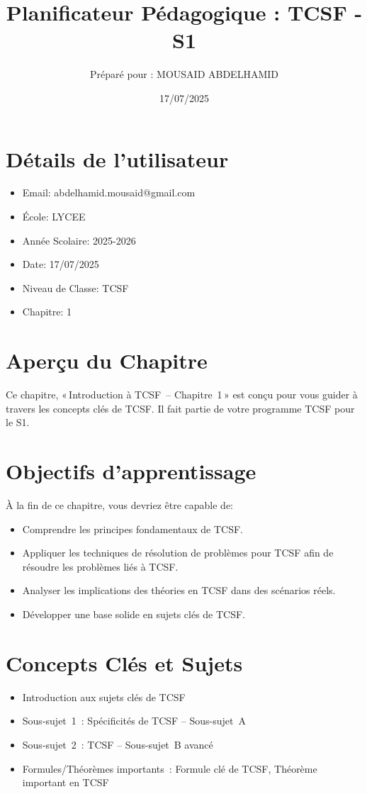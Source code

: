 \documentclass{article}
\title{Planificateur Pédagogique : TCSF - S1}
\author{Préparé pour : MOUSAID ABDELHAMID}
\date{17/07/2025}
\begin{document}
	
	\maketitle
	
	\section*{Détails de l'utilisateur}
	\begin{itemize}
		\item Email: abdelhamid.mousaid@gmail.com
		\item École: LYCEE
		\item Année Scolaire: 2025-2026
		\item Date: 17/07/2025
		\item Niveau de Classe: TCSF
		\item Chapitre: 1
	\end{itemize}
	
	\section*{Aperçu du Chapitre}
	Ce chapitre, « Introduction à TCSF – Chapitre 1 »  
	est conçu pour vous guider à travers les concepts clés de TCSF.  
	Il fait partie de votre programme TCSF pour le S1.
	
	\section*{Objectifs d'apprentissage}
	À la fin de ce chapitre, vous devriez être capable de:
	\begin{itemize}
		\item Comprendre les principes fondamentaux de TCSF.
		\item Appliquer les techniques de résolution de problèmes pour TCSF afin de résoudre les problèmes liés à TCSF.
		\item Analyser les implications des théories en TCSF dans des scénarios réels.
		\item Développer une base solide en sujets clés de TCSF.
	\end{itemize}
	
	\section*{Concepts Clés et Sujets}
	\begin{itemize}
		\item Introduction aux sujets clés de TCSF
		\item Sous-sujet 1 : Spécificités de TCSF – Sous-sujet A
		\item Sous-sujet 2 : TCSF – Sous-sujet B avancé
		\item Formules/Théorèmes importants : Formule clé de TCSF, Théorème important en TCSF
	\end{itemize}
	
\end{document}
